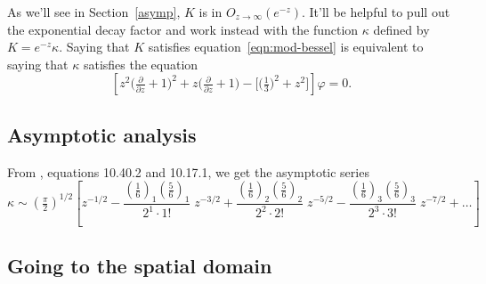 \documentclass{article}
\begin{document}
As we'll see in Section~\ref{asymp}, $K$ is in $O_{z \to \infty}(e^{-z})$. It'll be helpful to pull out the exponential decay factor and work instead with the function $\kappa$ defined by $K = e^{-z} \kappa$. Saying that $K$ satisfies equation~\ref{eqn:mod-bessel} is equivalent to saying that $\kappa$ satisfies the equation
\begin{equation}\label{eqn:shifted-mod-bessel}
\left[z^2 \big(\tfrac{\partial}{\partial z} + 1\big)^2 + z \big(\tfrac{\partial}{\partial z} + 1\big) - \big[\big(\tfrac{1}{3}\big)^2 + z^2\big]\right] \varphi = 0.
\end{equation}
\subsection{Asymptotic analysis}
From \cite{dlmf}, equations 10.40.2 and 10.17.1, we get the asymptotic series
\begin{equation}\label{bessel-asymp}
\kappa \sim \left(\tfrac{\pi}{2}\right)^{1/2} \left[ z^{-1/2} - \frac{(\tfrac{1}{6})_1 (\tfrac{5}{6})_1}{2^1 \cdot 1!}\;z^{-3/2} + \frac{(\tfrac{1}{6})_2 (\tfrac{5}{6})_2}{2^2 \cdot 2!}\;z^{-5/2} - \frac{(\tfrac{1}{6})_3 (\tfrac{5}{6})_3}{2^3 \cdot 3!}\;z^{-7/2} + \ldots \right]
\end{equation}
\subsection{Going to the spatial domain}
\end{document}
